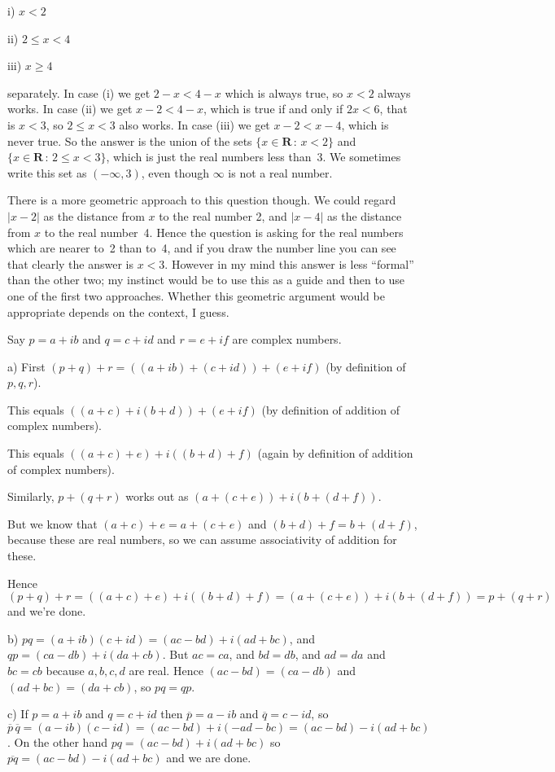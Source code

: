 \documentclass[10pt]{article}
\newcommand{\R}{\mathbf{R}}
\begin{document}
i) $x<2$

ii) $2\leq x<4$

iii) $x\geq4$

separately. In case (i) we get $2-x<4-x$ which is always true, so $x<2$ always works. In case (ii) we get $x-2<4-x$, which is true if and only if $2x<6$, that is $x<3$, so $2\leq x<3$ also works. In case (iii) we get $x-2<x-4$, which is never true. So the answer is the union of the sets $\{x\in\R\,:\,x<2\}$ and $\{x\in\R\,:\,2\leq x<3\}$, which is just the real numbers less than~3. We sometimes write this set as $(-\infty,3)$, even though $\infty$ is not a real number.

There is a more geometric approach to this question though. We could regard $|x-2|$ as the distance from $x$ to the real number 2, and $|x-4|$ as the distance from $x$ to the real number~4. Hence the question is asking for the real numbers which are nearer to~2 than to~4, and if you draw the number line you can see that clearly the answer is $x<3$. However in my mind this answer is less ``formal'' than the other two; my instinct would be to use this as a guide and then to use one of the first two approaches. Whether this geometric argument would be appropriate depends on the context, I guess.

\medskip{} Say $p=a+ib$ and $q=c+id$ and $r=e+if$ are complex numbers.

a) First $(p+q)+r=((a+ib)+(c+id))+(e+if)$ (by definition of $p,q,r$).

This equals $((a+c)+i(b+d))+(e+if)$ (by definition of addition of complex numbers).

This equals $((a+c)+e)+i((b+d)+f)$ (again by definition of addition of complex numbers).

Similarly, $p+(q+r)$ works out as $(a+(c+e))+i(b+(d+f))$.

But we know that $(a+c)+e=a+(c+e)$ and $(b+d)+f=b+(d+f)$, because these are real numbers, so we can assume associativity of addition for these.

Hence $(p+q)+r=((a+c)+e)+i((b+d)+f)=(a+(c+e))+i(b+(d+f))=p+(q+r)$ and we're done.

b) $pq=(a+ib)(c+id)=(ac-bd)+i(ad+bc)$, and $qp=(ca-db)+i(da+cb)$. But $ac=ca$, and $bd=db$, and $ad=da$ and $bc=cb$ because $a,b,c,d$ are real. Hence $(ac-bd)=(ca-db)$ and $(ad+bc)=(da+cb)$, so $pq=qp$.

c) If $p=a+ib$ and $q=c+id$ then $\overline{p}=a-ib$ and $\overline{q}=c-id$, so $\overline{p}\,\overline{q}=(a-ib)(c-id)=(ac-bd)+i(-ad-bc)=(ac-bd)-i(ad+bc)$. On the other hand $pq=(ac-bd)+i(ad+bc)$ so $\overline{pq}=(ac-bd)-i(ad+bc)$ and we are done.
\end{document}
